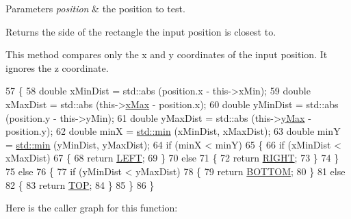 \begin{DoxyParams}{Parameters}
{\em position} & the position to test. \\
\hline
\end{DoxyParams}
\begin{DoxyReturn}{Returns}
the side of the rectangle the input position is closest to.
\end{DoxyReturn}
This method compares only the x and y coordinates of the input position. It ignores the z coordinate. 
\begin{DoxyCode}
57 \{
58   \textcolor{keywordtype}{double} xMinDist = std::abs (position.x - this->xMin);
59   \textcolor{keywordtype}{double} xMaxDist = std::abs (this->\hyperlink{classns3_1_1Rectangle_a73a0b805e1b7dabfe6c867eb03203faa}{xMax} - position.x);
60   \textcolor{keywordtype}{double} yMinDist = std::abs (position.y - this->yMin);
61   \textcolor{keywordtype}{double} yMaxDist = std::abs (this->\hyperlink{classns3_1_1Rectangle_a272ebb19702453c2fa7846b5c9c76b1c}{yMax} - position.y);
62   \textcolor{keywordtype}{double} minX = \hyperlink{80211b_8c_ac6afabdc09a49a433ee19d8a9486056d}{std::min} (xMinDist, xMaxDist);
63   \textcolor{keywordtype}{double} minY = \hyperlink{80211b_8c_ac6afabdc09a49a433ee19d8a9486056d}{std::min} (yMinDist, yMaxDist);
64   \textcolor{keywordflow}{if} (minX < minY)
65     \{
66       \textcolor{keywordflow}{if} (xMinDist < xMaxDist)
67         \{
68           \textcolor{keywordflow}{return} \hyperlink{classns3_1_1Rectangle_ac04d366f3d1e980f528c83a43b724feda67ba110ffaf72e2d655f5d2e3b02335b}{LEFT};
69         \}
70       \textcolor{keywordflow}{else}
71         \{
72           \textcolor{keywordflow}{return} \hyperlink{classns3_1_1Rectangle_ac04d366f3d1e980f528c83a43b724feda6c560125ea6b91362ced5a1428047299}{RIGHT};
73         \}
74     \}
75   \textcolor{keywordflow}{else}
76     \{
77       \textcolor{keywordflow}{if} (yMinDist < yMaxDist)
78         \{
79           \textcolor{keywordflow}{return} \hyperlink{classns3_1_1Rectangle_ac04d366f3d1e980f528c83a43b724feda040dbf3009db18216791ee4efce40ba8}{BOTTOM};
80         \}
81       \textcolor{keywordflow}{else}
82         \{
83           \textcolor{keywordflow}{return} \hyperlink{classns3_1_1Rectangle_ac04d366f3d1e980f528c83a43b724fedab9b10ad97f915fba0af133e872e69be2}{TOP};
84         \}
85     \}
86 \}
\end{DoxyCode}


Here is the caller graph for this function\+:


